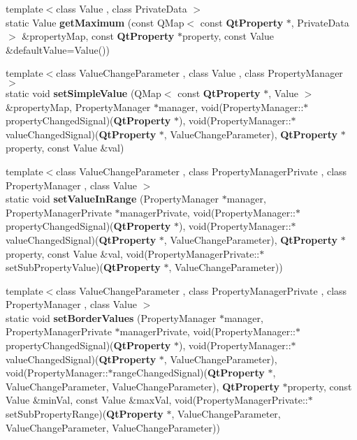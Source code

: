 \begin{DoxyCompactItemize}
\item 
{\footnotesize template$<$class Value , class Private\+Data $>$ }\\static Value {\bf get\+Maximum} (const Q\+Map$<$ const {\bf Qt\+Property} $\ast$, Private\+Data $>$ \&property\+Map, const {\bf Qt\+Property} $\ast$property, const Value \&default\+Value=Value())
\item 
{\footnotesize template$<$class Value\+Change\+Parameter , class Value , class Property\+Manager $>$ }\\static void {\bf set\+Simple\+Value} (Q\+Map$<$ const {\bf Qt\+Property} $\ast$, Value $>$ \&property\+Map, Property\+Manager $\ast$manager, void(Property\+Manager\+::$\ast$property\+Changed\+Signal)({\bf Qt\+Property} $\ast$), void(Property\+Manager\+::$\ast$value\+Changed\+Signal)({\bf Qt\+Property} $\ast$, Value\+Change\+Parameter), {\bf Qt\+Property} $\ast$property, const Value \&val)
\item 
{\footnotesize template$<$class Value\+Change\+Parameter , class Property\+Manager\+Private , class Property\+Manager , class Value $>$ }\\static void {\bf set\+Value\+In\+Range} (Property\+Manager $\ast$manager, Property\+Manager\+Private $\ast$manager\+Private, void(Property\+Manager\+::$\ast$property\+Changed\+Signal)({\bf Qt\+Property} $\ast$), void(Property\+Manager\+::$\ast$value\+Changed\+Signal)({\bf Qt\+Property} $\ast$, Value\+Change\+Parameter), {\bf Qt\+Property} $\ast$property, const Value \&val, void(Property\+Manager\+Private\+::$\ast$set\+Sub\+Property\+Value)({\bf Qt\+Property} $\ast$, Value\+Change\+Parameter))
\item 
{\footnotesize template$<$class Value\+Change\+Parameter , class Property\+Manager\+Private , class Property\+Manager , class Value $>$ }\\static void {\bf set\+Border\+Values} (Property\+Manager $\ast$manager, Property\+Manager\+Private $\ast$manager\+Private, void(Property\+Manager\+::$\ast$property\+Changed\+Signal)({\bf Qt\+Property} $\ast$), void(Property\+Manager\+::$\ast$value\+Changed\+Signal)({\bf Qt\+Property} $\ast$, Value\+Change\+Parameter), void(Property\+Manager\+::$\ast$range\+Changed\+Signal)({\bf Qt\+Property} $\ast$, Value\+Change\+Parameter, Value\+Change\+Parameter), {\bf Qt\+Property} $\ast$property, const Value \&min\+Val, const Value \&max\+Val, void(Property\+Manager\+Private\+::$\ast$set\+Sub\+Property\+Range)({\bf Qt\+Property} $\ast$,                                                                       Value\+Change\+Parameter, Value\+Change\+Parameter, Value\+Change\+Parameter))

\end{DoxyCompactItemize}
